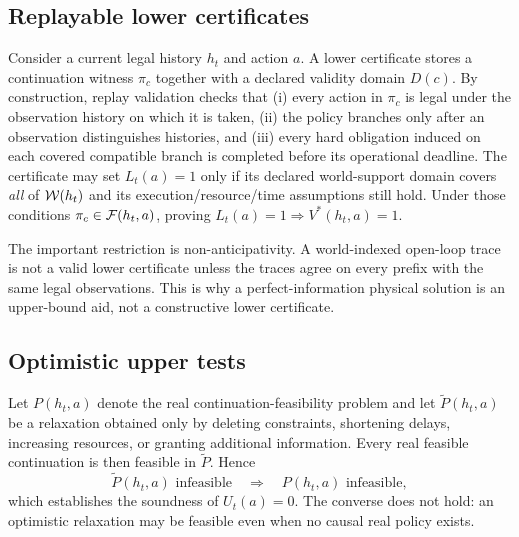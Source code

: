 \subsection{Replayable lower certificates}
Consider a current legal history $h_t$ and action $a$. A lower certificate stores a continuation witness $\pi_c$ together with a declared validity domain $D(c)$. By construction, replay validation checks that (i) every action in $\pi_c$ is legal under the observation history on which it is taken, (ii) the policy branches only after an observation distinguishes histories, and (iii) every hard obligation induced on each covered compatible branch is completed before its operational deadline. The certificate may set $L_t(a)=1$ only if its declared world-support domain covers \emph{all} of $\mathcal{W}(h_t)$ and its execution/resource/time assumptions still hold. Under those conditions $\pi_c\in\mathcal{F}(h_t,a)$, proving $L_t(a)=1\Rightarrow V^*(h_t,a)=1$.

The important restriction is non-anticipativity. A world-indexed open-loop trace is not a valid lower certificate unless the traces agree on every prefix with the same legal observations. This is why a perfect-information physical solution is an upper-bound aid, not a constructive lower certificate.

\subsection{Optimistic upper tests}
Let $P(h_t,a)$ denote the real continuation-feasibility problem and let $\widetilde P(h_t,a)$ be a relaxation obtained only by deleting constraints, shortening delays, increasing resources, or granting additional information. Every real feasible continuation is then feasible in $\widetilde P$. Hence
\begin{equation}
\widetilde P(h_t,a)\text{ infeasible}
\quad\Longrightarrow\quad
P(h_t,a)\text{ infeasible},
\end{equation}
which establishes the soundness of $U_t(a)=0$. The converse does not hold: an optimistic relaxation may be feasible even when no causal real policy exists.

